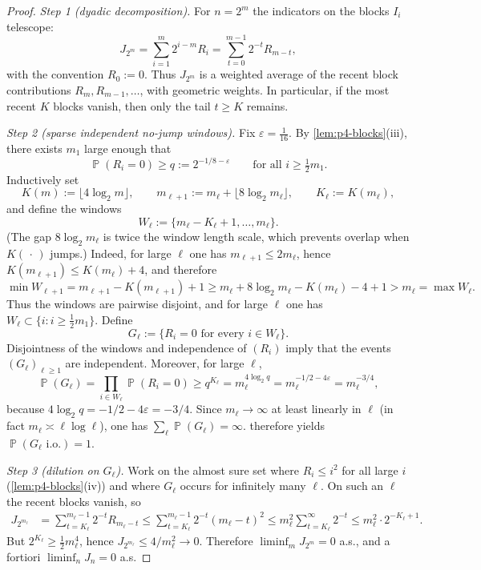 \documentclass[11pt,a4paper]{article}
\DeclareMathOperator{\Pbb}{\mathbb{P}}
\begin{document}
\begin{proof}
\textit{Step 1 (dyadic decomposition).}
For \(n=2^m\) the indicators on the blocks \(I_i\) telescope:
\[
J_{2^m}
=
\sum_{i=1}^m 2^{i-m}R_i
=
\sum_{t=0}^{m-1}2^{-t}R_{m-t},
\]
with the convention \(R_0:=0\). Thus \(J_{2^m}\) is a weighted average of the recent block contributions \(R_m,R_{m-1},\dots\), with geometric weights. In particular, if the most recent \(K\) blocks vanish, then only the tail \(t\ge K\) remains.

\textit{Step 2 (sparse independent no-jump windows).}
Fix \(\varepsilon=\tfrac1{16}\). By \cref{lem:p4-blocks}(iii), there exists \(m_1\) large enough that
\[
\Pbb(R_i=0)
\ge
q
:=
2^{-1/8-\varepsilon}
\qquad\text{for all }i\ge \tfrac12 m_1.
\]
Inductively set
\[
K(m):=\bigl\lfloor 4\log_2 m\bigr\rfloor,
\qquad
m_{\ell+1}:=m_\ell+\bigl\lfloor 8\log_2 m_\ell\bigr\rfloor,
\qquad
K_\ell:=K(m_\ell),
\]
and define the windows
\[
W_\ell:=\{m_\ell-K_\ell+1,\dots,m_\ell\}.
\]
(The gap \(8\log_2 m_\ell\) is twice the window length scale, which prevents overlap when \(K(\,\cdot\,)\) jumps.) Indeed, for large \(\ell\) one has \(m_{\ell+1}\le 2m_\ell\), hence \(K(m_{\ell+1})\le K(m_\ell)+4\), and therefore
\[
\min W_{\ell+1}
=
m_{\ell+1}-K(m_{\ell+1})+1
\ge
m_\ell+8\log_2 m_\ell-K(m_\ell)-4+1
>
m_\ell
=
\max W_\ell.
\]
Thus the windows are pairwise disjoint, and for large \(\ell\) one has \(W_\ell\subset\{i:i\ge\tfrac12 m_1\}\). Define
\[
G_\ell:=\{R_i=0\text{ for every }i\in W_\ell\}.
\]
Disjointness of the windows and independence of \((R_i)\) imply that the events \((G_\ell)_{\ell\ge 1}\) are independent. Moreover, for large \(\ell\),
\[
\Pbb(G_\ell)
=
\prod_{i\in W_\ell}\Pbb(R_i=0)
\ge
q^{K_\ell}
=
m_\ell^{4\log_2 q}
=
m_\ell^{-1/2-4\varepsilon}
=
m_\ell^{-3/4},
\]
because \(4\log_2 q=-1/2-4\varepsilon=-3/4\). Since \(m_\ell\to\infty\) at least linearly in \(\ell\) (in fact \(m_\ell\asymp\ell\log\ell\)), one has \(\sum_\ell\Pbb(G_\ell)=\infty\).  therefore yields \(\Pbb(G_\ell\text{ i.o.})=1\).

\textit{Step 3 (dilution on \(G_\ell\)).}
Work on the almost sure set where \(R_i\le i^2\) for all large \(i\) (\cref{lem:p4-blocks}(iv)) and where \(G_\ell\) occurs for infinitely many \(\ell\). On such an \(\ell\) the recent blocks vanish, so
\begin{align*}
J_{2^{m_\ell}}
&=
\sum_{t=K_\ell}^{m_\ell-1}2^{-t}R_{m_\ell-t}
\le
\sum_{t=K_\ell}^{m_\ell-1}2^{-t}(m_\ell-t)^2
\le
m_\ell^2\sum_{t=K_\ell}^\infty 2^{-t}
\le
m_\ell^2\cdot 2^{-K_\ell+1}.
\end{align*}
But \(2^{K_\ell}\ge\tfrac12 m_\ell^4\), hence \(J_{2^{m_\ell}}\le 4/m_\ell^2\to 0\). Therefore \(\liminf_m J_{2^m}=0\) a.s., and a fortiori \(\liminf_n J_n=0\) a.s.
\end{proof}
\end{document}
